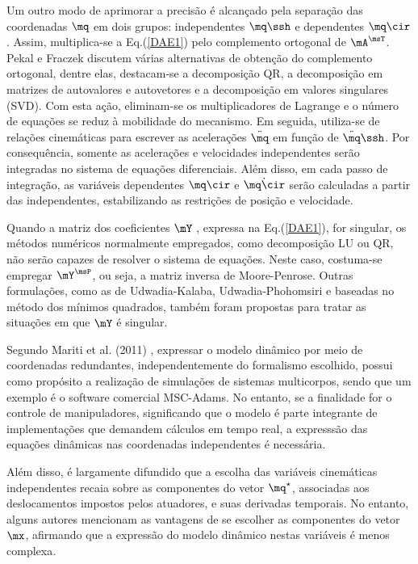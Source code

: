 \documentclass[]{politex}
\begin{document}

Um outro modo de aprimorar a precisão é alcançado pela separação das coordenadas $\mq$ em dois grupos: independentes $\mq\ssh$ e dependentes $\mq\cir$. Assim, multiplica-se a Eq.(\ref{DAE1}) pelo complemento ortogonal \cite{Kordjazi} de $\mA^\msT$. Pekal e Fraczek \cite{Pekal} discutem várias alternativas de obtenção do complemento ortogonal, dentre elas, destacam-se a decomposição QR, a decomposição em matrizes de autovalores e autovetores e a decomposição em valores singulares (SVD). Com esta ação, eliminam-se os multiplicadores de Lagrange e o número de equações se reduz à mobilidade do mecanismo. Em seguida, utiliza-se de relações cinemáticas para  escrever as acelerações $\ddot{\mq}$ em função de $\ddot{\mq}\ssh$. Por consequência, somente as acelerações e velocidades independentes serão integradas no sistema de equações diferenciais. Além disso, em cada passo de integração, as variáveis dependentes $\mq\cir$ e $\dot{\mq\cir}$ serão calculadas a partir das independentes, estabilizando as restrições de posição e velocidade.

Quando a matriz dos coeficientes $\mY$ , expressa na Eq.(\ref{DAE1}), for singular, os métodos numéricos normalmente empregados, como decomposição LU ou QR, não serão capazes de resolver o sistema de equações. Neste caso, costuma-se empregar $\mY^\msP$, ou seja, a matriz inversa de Moore-Penrose. Outras formulações, como as de Udwadia-Kalaba, Udwadia-Phohomsiri e baseadas no método dos mínimos quadrados, também foram propostas para tratar as situações em que $\mY$ é singular.

Segundo Mariti et al. (2011) \cite{Mariti}, expressar o modelo dinâmico por meio de coordenadas redundantes, independentemente do formalismo escolhido, possui como propósito a realização de simulações de sistemas multicorpos, sendo que um exemplo é o software comercial MSC-Adams. No entanto, se a finalidade for o controle de manipuladores, significando que o modelo é parte integrante de implementações que demandem  cálculos em tempo real, a expresssão das equações dinâmicas nas coordenadas independentes é necessária.

Além disso, é largamente difundido que a escolha das variáveis cinemáticas independentes recaia sobre as componentes do vetor $\mq^\star$, associadas aos deslocamentos impostos pelos atuadores, e suas derivadas temporais. No entanto, alguns autores \cite{Li, Khalil2} mencionam as vantagens de se escolher as componentes do vetor $\mx$, afirmando que a expressão do modelo dinâmico nestas variáveis é menos complexa.
\end{document}
